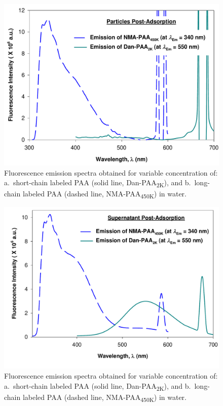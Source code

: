 \documentclass[twoside,twocolumn,9pt]{article}
\begin{document}
\begin{figure}[h]
\includegraphics[scale=0.35]{Figure6.pdf}
\caption{Fluorescence emission spectra obtained for variable concentration of: a.\ short-chain labeled PAA (solid line, Dan-PAA\textsubscript{2K}), and b.\ long-chain labeled PAA (dashed line, NMA-PAA\textsubscript{450K}) in water.}
\label{figure 5}
\end{figure}


\begin{figure}[h]
\includegraphics[scale=0.35]{Figure7.pdf}
\caption{Fluorescence emission spectra obtained for variable concentration of: a.\ short-chain labeled PAA (solid line, Dan-PAA\textsubscript{2K}), and b.\ long-chain labeled PAA (dashed line, NMA-PAA\textsubscript{450K}) in water.}
\label{figure 6}
\end{figure}
\end{document}
